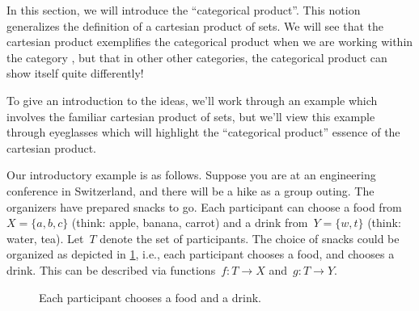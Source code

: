 

%


In this section, we will introduce the ``categorical product''.
This notion generalizes the definition of a cartesian product of sets.
We will see that the cartesian product exemplifies the categorical product when we are working within the category \Set, but that in other other categories, the categorical product can show itself quite differently!

To give an introduction to the ideas, we'll work through an example which involves the familiar cartesian product of sets, but we'll view this example through eyeglasses which will highlight the ``categorical product'' essence of the cartesian product.

Our introductory example is as follows.
Suppose you are at an engineering conference in Switzerland, and there will be a hike as a group outing.
The organizers have prepared snacks to go.
Each participant can choose a food from~$X=\{a,b,c\}$ (think: apple, banana, carrot) and a drink from~$Y=\{w,t\}$ (think: water, tea).
Let~$T$ denote the set of participants.
The choice of snacks could be organized as depicted in \cref{fig:snacks_1}, i.e., each participant chooses a food, and chooses a drink.
This can be described via functions~$f\colon T \to X$ and~$g\colon  T \to Y$.

\begin{figure}[h!]
  \begin{center}
  \end{center}
  \caption{Each participant chooses a food and a drink.}
  \label{fig:snacks_1}
\end{figure}




